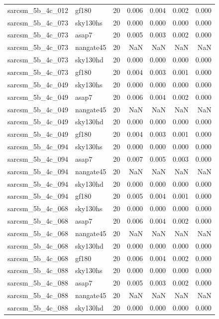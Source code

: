 \begin{tabular}{llrrrrr}
sarcsm\_5b\_4c\_012 & gf180 & 20 & 0.006 & 0.004 & 0.002 & 0.000 \\
sarcsm\_5b\_4c\_073 & sky130hs & 20 & 0.000 & 0.000 & 0.000 & 0.000 \\
sarcsm\_5b\_4c\_073 & asap7 & 20 & 0.005 & 0.003 & 0.002 & 0.000 \\
sarcsm\_5b\_4c\_073 & nangate45 & 20 & NaN & NaN & NaN & NaN \\
sarcsm\_5b\_4c\_073 & sky130hd & 20 & 0.000 & 0.000 & 0.000 & 0.000 \\
sarcsm\_5b\_4c\_073 & gf180 & 20 & 0.004 & 0.003 & 0.001 & 0.000 \\
sarcsm\_5b\_4c\_049 & sky130hs & 20 & 0.000 & 0.000 & 0.000 & 0.000 \\
sarcsm\_5b\_4c\_049 & asap7 & 20 & 0.006 & 0.004 & 0.002 & 0.000 \\
sarcsm\_5b\_4c\_049 & nangate45 & 20 & NaN & NaN & NaN & NaN \\
sarcsm\_5b\_4c\_049 & sky130hd & 20 & 0.000 & 0.000 & 0.000 & 0.000 \\
sarcsm\_5b\_4c\_049 & gf180 & 20 & 0.004 & 0.003 & 0.001 & 0.000 \\
sarcsm\_5b\_4c\_094 & sky130hs & 20 & 0.000 & 0.000 & 0.000 & 0.000 \\
sarcsm\_5b\_4c\_094 & asap7 & 20 & 0.007 & 0.005 & 0.003 & 0.000 \\
sarcsm\_5b\_4c\_094 & nangate45 & 20 & NaN & NaN & NaN & NaN \\
sarcsm\_5b\_4c\_094 & sky130hd & 20 & 0.000 & 0.000 & 0.000 & 0.000 \\
sarcsm\_5b\_4c\_094 & gf180 & 20 & 0.005 & 0.004 & 0.001 & 0.000 \\
sarcsm\_5b\_4c\_068 & sky130hs & 20 & 0.000 & 0.000 & 0.000 & 0.000 \\
sarcsm\_5b\_4c\_068 & asap7 & 20 & 0.006 & 0.004 & 0.002 & 0.000 \\
sarcsm\_5b\_4c\_068 & nangate45 & 20 & NaN & NaN & NaN & NaN \\
sarcsm\_5b\_4c\_068 & sky130hd & 20 & 0.000 & 0.000 & 0.000 & 0.000 \\
sarcsm\_5b\_4c\_068 & gf180 & 20 & 0.006 & 0.004 & 0.002 & 0.000 \\
sarcsm\_5b\_4c\_088 & sky130hs & 20 & 0.000 & 0.000 & 0.000 & 0.000 \\
sarcsm\_5b\_4c\_088 & asap7 & 20 & 0.005 & 0.003 & 0.002 & 0.000 \\
sarcsm\_5b\_4c\_088 & nangate45 & 20 & NaN & NaN & NaN & NaN \\
sarcsm\_5b\_4c\_088 & sky130hd & 20 & 0.000 & 0.000 & 0.000 & 0.000 \\

\end{tabular}
